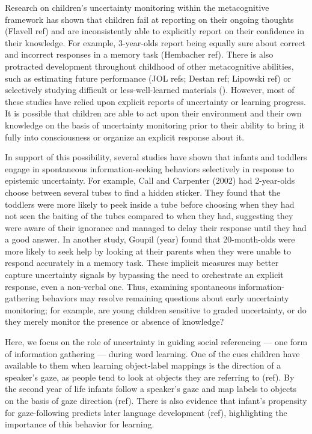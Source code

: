 \documentclass[10pt, letterpaper]{article}
\begin{document}
Research on children's uncertainty monitoring within the metacognitive
framework has shown that children fail at reporting on their ongoing
thoughts (Flavell ref) and are inconsistently able to explicitly report
on their confidence in their knowledge. For example, 3-year-olds report
being equally sure about correct and incorrect responses in a memory
task (Hembacher ref). There is also protracted development throughout
childhood of other metacognitive abilities, such as estimating future
performance (JOL refs; Destan ref; Lipowski ref) or selectively studying
difficult or less-well-learned materials (). However, most of these
studies have relied upon explicit reports of uncertainty or learning
progress. It is possible that children are able to act upon their
environment and their own knowledge on the basis of uncertainty
monitoring prior to their ability to bring it fully into consciousness
or organize an explicit response about it.

In support of this possibility, several studies have shown that infants
and toddlers engage in spontaneous information-seeking behaviors
selectively in response to epistemic uncertainty. For example, Call and
Carpenter (2002) had 2-year-olds choose between several tubes to find a
hidden sticker. They found that the toddlers were more likely to peek
inside a tube before choosing when they had not seen the baiting of the
tubes compared to when they had, suggesting they were aware of their
ignorance and managed to delay their response until they had a good
answer. In another study, Goupil (year) found that 20-month-olds were
more likely to seek help by looking at their parents when they were
unable to respond accurately in a memory task. These implicit measures
may better capture uncertainty signals by bypassing the need to
orchestrate an explicit response, even a non-verbal one. Thus, examining
spontaneous information-gathering behaviors may resolve remaining
questions about early uncertainty monitoring; for example, are young
children sensitive to graded uncertainty, or do they merely monitor the
presence or absence of knowledge?

Here, we focus on the role of uncertainty in guiding social referencing
--- one form of information gathering --- during word learning. One of
the cues children have available to them when learning object-label
mappings is the direction of a speaker's gaze, as people tend to look at
objects they are referring to (ref). By the second year of life infants
follow a speaker's gaze and map labels to objects on the basis of gaze
direction (ref). There is also evidence that infant's propensity for
gaze-following predicts later language development (ref), highlighting
the importance of this behavior for learning.
\end{document}
